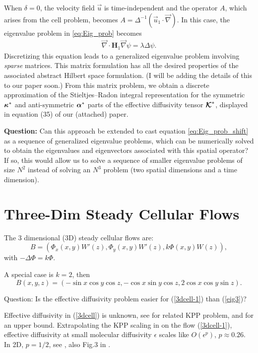 \documentclass{article}
\newcommand{\be}{\begin{equation}}
\newcommand{\ee}{\end{equation}}
\newcommand{\Hb}{\mathbf{H}}
\newcommand\bkappa{\mbox{\boldmath${\kappa}$}}
\newcommand\balpha{\mbox{\boldmath${\alpha}$}}
\newcommand\Kbc{\mbox{\boldmath${\mathcal{K}}$}}
\begin{document}
When $\delta=0$, the velocity field $\vec{u}$ is time-independent and the
operator $A$, which arises from the cell problem, becomes
$A=\Delta^{-1}(\vec{u}_1\cdot\vec{\nabla})$. In this case, the eigenvalue problem in
\eqref{eq:Eig_prob} becomes 
%
\begin{align}\label{eq:Eig_prob_steady}
  \vec{\nabla}\cdot\Hb_1\vec{\nabla}\psi=\lambda\Delta\psi.
\end{align}
%
Discretizing this equation leads to a generalized eigenvalue
problem involving \emph{sparse} matrices. This matrix formulation has
all the desired properties of the associated abstract Hilbert space
formulation. (I will be adding the details of this to our paper soon.)
From this matrix problem, we obtain a discrete approximation of the
Stieltjes--Radon integral representation for the symmetric $\bkappa^*$
and anti-symmetric $\balpha^*$ parts of the effective diffusivity
tensor $\Kbc^*$, displayed in equation (35) of our (attached) paper.  


\vspace{1em}
\noindent\textbf{Question:} Can this approach be extended to cast
equation \eqref{eq:Eig_prob_shift} as a sequence of generalized
eigenvalue problems, which can be numerically solved to obtain the
eigenvalues and eigenvectors associated with this spatial operator? If
so, this would allow us to solve a sequence of smaller eigenvalue
problems of size $N^2$ instead of solving an $N^3$ problem (two
spatial dimensions and a time dimension). 






\section{Three-Dim Steady Cellular Flows}
The 3 dimensional (3D) steady cellular flows are:
\be
B =
(\Phi_x(x,y)W'(z),\Phi_y(x,y)W'(z),k\Phi(x,y)W(z)), \label{3dcell}
\ee
with $-\Delta \Phi = k \Phi.$   
\medskip

A special case is $k=2$, then
\be
B(x,y,z) =
(-\sin{x}\cos{y}\cos{z},-\cos{x}\sin{y}\cos{z},2\cos{x}\cos{y}\sin{z}).\label{3dcell-1}
\ee
\medskip

Question: Is the effective diffusivity problem easier for (\ref{3dcell-1}) than (\ref{eig3})? 
\medskip

Effective diffusivity in (\ref{3dcell}) is unknown, see \cite{SXZ_13} for 
related KPP problem, and \cite{RZ_07} for an upper bound. Extrapolating the KPP scaling in \cite{SXZ_13} on 
the flow (\ref{3dcell-1}), effective diffusivity at small molecular diffusivity $\epsilon$ scales like $O(\epsilon^{p})$, $p \approx 0.26$. 
In 2D, $p=1/2$, see \cite{fannjiang}, also Fig.3 in \cite{Biferale_95}.    
\end{document}
